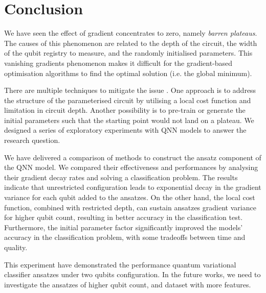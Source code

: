 \section{Conclusion}
We have seen the effect of gradient concentrates to zero, namely \emph{barren plateaus}.
The causes of this phenomenon are related to the depth of the circuit, the width of the qubit registry to measure, and the randomly initialised parameters.
This vanishing gradients phenomenon makes it difficult for the gradient-based optimisation algorithms to find the optimal solution (i.e. the global minimum).

There are multiple techniques to mitigate the issue \cite{cerezoCostFunctionDependent2021, skolikLayerwiseLearningQuantum2021, grantInitializationStrategyAddressing2019}.
One approach is to address the structure of the parameterised circuit by utilising a local cost function and limitation in circuit depth.
Another possibility is to pre-train or generate the initial parameters such that the starting point would not land on a plateau.
We designed a series of exploratory experiments with QNN models to answer the research question.

We have delivered a comparison of methods to construct the ansatz component of the QNN model.
We compared their effectiveness and performances by analysing their gradient decay rates and solving a classification problem.
The results indicate that unrestricted configuration leads to exponential decay in the gradient variance for each qubit added to the ansatzes.
On the other hand, the local cost function, combined with restricted depth, can sustain ansatzes gradient variance for higher qubit count, resulting in better accuracy in the classification test.
Furthermore, the initial parameter factor significantly improved the models' accuracy in the classification problem, with some tradeoffs between time and quality.

This experiment have demonstrated the performance quantum variational classifier ansatzes under two qubits configuration.
In the future works, we need to investigate the ansatzes of higher qubit count, and dataset with more features.

